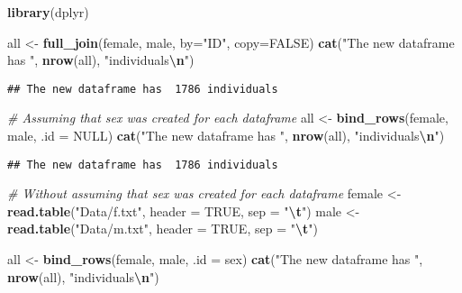 \documentclass[
]{book}
\newenvironment{Shaded}{\begin{snugshade}}{\end{snugshade}}
\newcommand{\AttributeTok}[1]{\textcolor[rgb]{0.13,0.29,0.53}{#1}}
\newcommand{\CommentTok}[1]{\textcolor[rgb]{0.56,0.35,0.01}{\textit{#1}}}
\newcommand{\ConstantTok}[1]{\textcolor[rgb]{0.56,0.35,0.01}{#1}}
\newcommand{\FunctionTok}[1]{\textcolor[rgb]{0.13,0.29,0.53}{\textbf{#1}}}
\newcommand{\NormalTok}[1]{#1}
\newcommand{\OtherTok}[1]{\textcolor[rgb]{0.56,0.35,0.01}{#1}}
\newcommand{\SpecialCharTok}[1]{\textcolor[rgb]{0.81,0.36,0.00}{\textbf{#1}}}
\newcommand{\StringTok}[1]{\textcolor[rgb]{0.31,0.60,0.02}{#1}}
\begin{document}
\begin{Shaded}
\begin{Highlighting}[]
\FunctionTok{library}\NormalTok{(dplyr)}

\NormalTok{all }\OtherTok{\textless{}{-}} \FunctionTok{full\_join}\NormalTok{(female, male, }\AttributeTok{by=}\StringTok{"ID"}\NormalTok{, }\AttributeTok{copy=}\ConstantTok{FALSE}\NormalTok{)}
\FunctionTok{cat}\NormalTok{(}\StringTok{"The new dataframe has "}\NormalTok{, }\FunctionTok{nrow}\NormalTok{(all), }\StringTok{"individuals}\SpecialCharTok{\textbackslash{}n}\StringTok{"}\NormalTok{)}
\end{Highlighting}
\end{Shaded}

\begin{verbatim}
## The new dataframe has  1786 individuals
\end{verbatim}

\begin{Shaded}
\begin{Highlighting}[]
\CommentTok{\# Assuming that \textasciigrave{}sex\textasciigrave{} was created for each dataframe}
\NormalTok{all }\OtherTok{\textless{}{-}} \FunctionTok{bind\_rows}\NormalTok{(female, male, }\AttributeTok{.id =} \ConstantTok{NULL}\NormalTok{)}
\FunctionTok{cat}\NormalTok{(}\StringTok{"The new dataframe has "}\NormalTok{, }\FunctionTok{nrow}\NormalTok{(all), }\StringTok{"individuals}\SpecialCharTok{\textbackslash{}n}\StringTok{"}\NormalTok{)}
\end{Highlighting}
\end{Shaded}

\begin{verbatim}
## The new dataframe has  1786 individuals
\end{verbatim}

\begin{Shaded}
\begin{Highlighting}[]
\CommentTok{\# Without assuming that \textasciigrave{}sex\textasciigrave{} was created for each dataframe}
\NormalTok{female }\OtherTok{\textless{}{-}} \FunctionTok{read.table}\NormalTok{(}\StringTok{"Data/f.txt"}\NormalTok{, }\AttributeTok{header =} \ConstantTok{TRUE}\NormalTok{, }\AttributeTok{sep =} \StringTok{"}\SpecialCharTok{\textbackslash{}t}\StringTok{"}\NormalTok{)}
\NormalTok{male }\OtherTok{\textless{}{-}} \FunctionTok{read.table}\NormalTok{(}\StringTok{"Data/m.txt"}\NormalTok{, }\AttributeTok{header =} \ConstantTok{TRUE}\NormalTok{, }\AttributeTok{sep =} \StringTok{"}\SpecialCharTok{\textbackslash{}t}\StringTok{"}\NormalTok{)}

\NormalTok{all }\OtherTok{\textless{}{-}} \FunctionTok{bind\_rows}\NormalTok{(female, male, }\AttributeTok{.id =} \StringTok{\textquotesingle{}sex\textquotesingle{}}\NormalTok{)}
\FunctionTok{cat}\NormalTok{(}\StringTok{"The new dataframe has "}\NormalTok{, }\FunctionTok{nrow}\NormalTok{(all), }\StringTok{"individuals}\SpecialCharTok{\textbackslash{}n}\StringTok{"}\NormalTok{)}
\end{Highlighting}
\end{Shaded}
\end{document}
